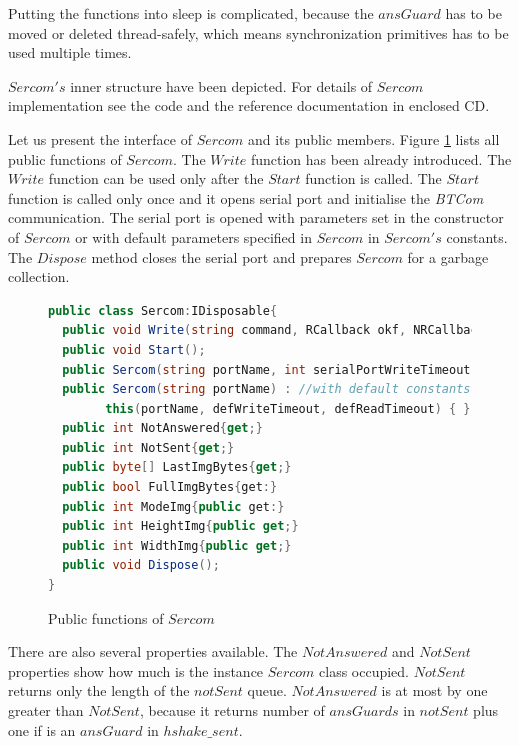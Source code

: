   Putting the functions into sleep is complicated, because the $ansGuard$ has to be moved or deleted thread-safely,
  which means synchronization primitives has to be used multiple times.
  
  
  $Sercom's$ inner structure have been depicted. For details of 
  $Sercom$ implementation see the code and the reference documentation in enclosed CD.

  Let  us present the interface of $Sercom$ and its public members.
  Figure \ref{publicser} lists all public functions of $Sercom$.
  The $Write$ function has been already introduced. The $Write$ function can be used only
  after the $Start$ function is called. The $Start$ function is called only once and
  it opens serial port and initialise the {\it BTCom} communication. 
  The serial port is opened with parameters set in the constructor of $Sercom$ or with
  default parameters specified in $Sercom$ in $Sercom's$ constants. The $Dispose$ method closes the serial port
  and prepares $Sercom$ for a garbage collection.

\begin{figure}[!hbp]
\begin{lstlisting}[language=cs]
public class Sercom:IDisposable{
  public void Write(string command, RCallback okf, NRCallback kof,object state, double timeout);
  public void Start();
  public Sercom(string portName, int serialPortWriteTimeout, int serialPortReadTimeout);
  public Sercom(string portName) : //with default constants
        this(portName, defWriteTimeout, defReadTimeout) { }
  public int NotAnswered{get;}
  public int NotSent{get;}
  public byte[] LastImgBytes{get;}
  public bool FullImgBytes{get:}
  public int ModeImg{public get:}
  public int HeightImg{public get;}
  public int WidthImg{public get;}
  public void Dispose();
}
\end{lstlisting}
\caption{Public functions of $Sercom$} \label{publicser}	
\end{figure}

  There are also several properties available. The $NotAnswered$ and $NotSent$ properties
  show how much is the instance $Sercom$ class occupied. $NotSent$ returns only the length of the $notSent$ queue. 
  $NotAnswered$ is at most by one greater than $NotSent$,
  because it returns number of $ansGuards$ in $notSent$ plus one if is an $ansGuard$ in $hshake\_sent$.


